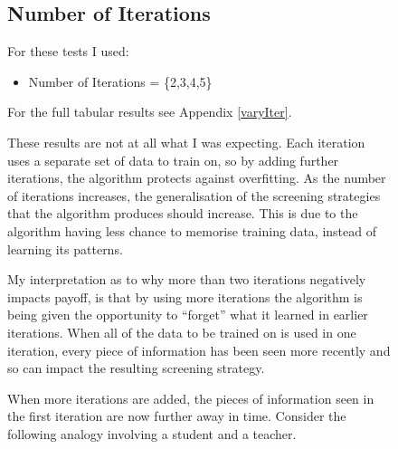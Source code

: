 \begin{figure}[p]
    \setlength{\parindent}{24pt}
    \subsection{Number of Iterations}
    For these tests I used:
    \begin{itemize}
        \item Number of Iterations = \{2,3,4,5\}
    \end{itemize}
    
    \begin{center}
    \end{center}
    
    \noindent For the full tabular results see Appendix \ref{varyIter}.
    \vspace{4mm}
    
    {\centering
    }
    \newline
    
    These results are not at all what I was expecting. Each iteration uses a separate set of data to train on, so by adding further iterations, the algorithm protects against overfitting. As the number of iterations increases, the generalisation of the screening strategies that the algorithm produces should increase. This is due to the algorithm having less chance to memorise training data, instead of learning its patterns. \newline
    
    My interpretation as to why more than two iterations negatively impacts payoff, is that by using more iterations the algorithm is being given the opportunity to ``forget'' what it learned in earlier iterations. When all of the data to be trained on is used in one iteration, every piece of information has been seen more recently and so can impact the resulting screening strategy. \newline
    
    When more iterations are added, the pieces of information seen in the first iteration are  now further away in time. Consider the following analogy involving a student and a teacher.
    
\end{figure}


